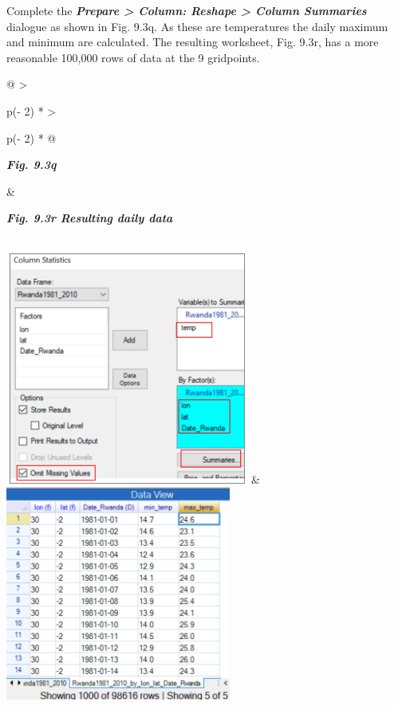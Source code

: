 \documentclass[
  letterpaper,
  DIV=11,
  numbers=noendperiod]{scrreprt}
\begin{document}
Complete the \textbf{\emph{Prepare \textgreater{} Column: Reshape
\textgreater{} Column Summaries}} dialogue as shown in Fig. 9.3q. As
these are temperatures the daily maximum and minimum are calculated. The
resulting worksheet, Fig. 9.3r, has a more reasonable 100,000 rows of
data at the 9 gridpoints.

\begin{longtable}[]{@{}
  >{\raggedright\arraybackslash}p{(\columnwidth - 2\tabcolsep) * }
  >{\raggedright\arraybackslash}p{(\columnwidth - 2\tabcolsep) * }@{}}
\toprule\noalign{}
\begin{minipage}[b]{\linewidth}\raggedright
\textbf{\emph{Fig. 9.3q}}
\end{minipage} & \begin{minipage}[b]{\linewidth}\raggedright
\textbf{\emph{Fig. 9.3r Resulting daily data}}
\end{minipage} \\
\midrule\noalign{}
\endhead
\bottomrule\noalign{}
\endlastfoot
\includegraphics[width=3.14829in,height=3.01165in]{figures/Fig9.3q.png}
&
\includegraphics[width=2.91954in,height=2.77761in]{figures/Fig9.3r.png} \\
\end{longtable}
\end{document}
